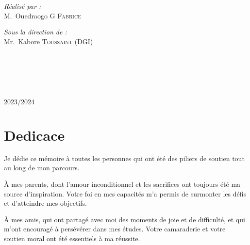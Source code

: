 \documentclass[a4paper,12pt]{report}
\begin{document}
\begin{titlepage}
\begin{center}
\noindent
\begin{minipage}{0.4\textwidth}
  \begin{flushleft} \large
    \emph{\color{orange!80!black}Réalisé par :}\\
    M.~Ouedraogo \textsc{G Fabrice}\\
  \end{flushleft}
\end{minipage}%
\begin{minipage}{0.5\textwidth}
  \begin{flushright} \large
    \emph{\color{orange!80!black}Sous la direction de :} \\
    Mr.~Kabore \textsc{Toussaint} (DGI)
  \end{flushright}
\end{minipage}\\[1cm]

\\[0.5cm]

\color{black}
\centering
\begin{tabular}{lll}

\end{tabular}

\vfill

{\large \color{orange!80!black}{Année universitaire}\\ \color{blue!80!black}2023/2024}
\end{center}
\end{titlepage}
\newpage
\tableofcontents
\newpage


\chapter*{Dedicace}
Je dédie ce mémoire à toutes les personnes qui ont été des piliers de soutien tout au long de mon parcours.

À mes parents, dont l'amour inconditionnel et les sacrifices ont toujours été ma source d'inspiration. Votre foi en mes capacités m’a permis de surmonter les défis et d’atteindre mes objectifs.

À mes amis, qui ont partagé avec moi des moments de joie et de difficulté, et qui m'ont encouragé à persévérer dans mes études. Votre camaraderie et votre soutien moral ont été essentiels à ma réussite.
\end{document}
